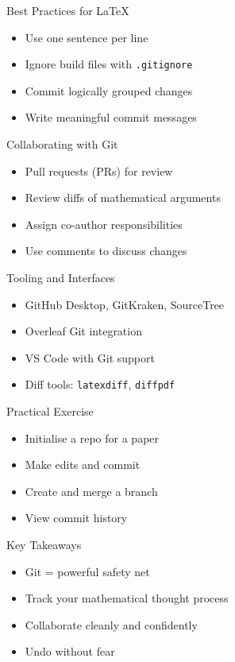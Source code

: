\documentclass[12pt,t]{beamer}
\begin{document}
\begin{frame}{Best Practices for \LaTeX}
\begin{itemize}
    \item Use one sentence per line
		\pause
    \item Ignore build files with \texttt{.gitignore}
		\pause
    \item Commit logically grouped changes
		\pause
    \item Write meaningful commit messages
\end{itemize}
\end{frame}

\begin{frame}{Collaborating with Git}
\begin{itemize}
    \item Pull requests (PRs) for review
		\pause
    \item Review diffs of mathematical arguments
		\pause
    \item Assign co-author responsibilities
		\pause
    \item Use comments to discuss changes
\end{itemize}
\end{frame}

\begin{frame}{Tooling and Interfaces}
\begin{itemize}
    \item GitHub Desktop, GitKraken, SourceTree
		\pause
    \item Overleaf Git integration
		\pause
    \item VS Code with Git support
		\pause
    \item Diff tools: \texttt{latexdiff}, \texttt{diffpdf}
\end{itemize}
\end{frame}

\begin{frame}{Practical Exercise}
\begin{itemize}
    \item Initialise a repo for a paper
		\pause
    \item Make edits and commit
		\pause
    \item Create and merge a branch
		\pause
    \item View commit history
\end{itemize}
\end{frame}

\begin{frame}{Key Takeaways}
\begin{itemize}
    \item Git = powerful safety net
		\pause
    \item Track your mathematical thought process
		\pause
    \item Collaborate cleanly and confidently
		\pause
    \item Undo without fear
\end{itemize}
\end{frame}
\end{document}
